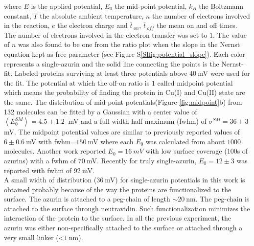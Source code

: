 \documentclass[journal=jacsat,manuscript=article]{achemso}
\newcommand*\me[1]{\ensuremath{\bar{#1}\,}}
\begin{document}
where $E$ is the applied potential, $E_0$ the mid-point potential, $k_B$ the Boltzmann constant, $T$ the absolute ambient temperature, $n$ the number of electrons involved in the reaction, $e$ the electron charge and $\me{t}_{on}$, $\me{t}_{off}$ the mean on and off times. The number of electrons involved in the electron transfer was set to $1$. The value of $n$ was also found to be one from the ratio plot when the slope in the Nernst equation kept as free parameter (see Figure-S\ref{SIfig:potential_slope}). Each color represents a single-azurin and the solid line connecting the points is the Nernst-fit. Labeled proteins surviving at least three potentials above $40~$mV were used for the fit. The potential at which the off-on ratio is $1$ called midpoint potential which means the probability of finding the protein in Cu(I) and Cu(II) state are the same. The distribution of mid-point potentials(Figure-\ref{fig:midpoint}b) from 132 molecules can be fitted by a Gaussian with a center value of $\left<E_0^{SM}\right>=4.5 \pm 1.2~$ mV and a full width half maximum (fwhm) of $\sigma^{SM}=36 \pm 3~$ mV. The midpoint potential values are similar to previously reported values of $6\pm0.6~$mV with fwhm=$150~$mV where each $E_0$ was calculated from about $1000$ molecules.\cite{davis2006monitoring} Another work reported $E_0 = 16~mV$ with low surface coverage (100s of azurins) with a fwhm of $70~$mV.\cite{salverda2010fluorescent} Recently for truly single-azurin, $E_0=12\pm3$ was reported with fwhm of $92~$mV.\cite{akkilic2014chemically-induced}\\
A small width of distribution ($36~$mV) for single-azurin potentials in this work is obtained probably because of the way the proteins are functionalized to the surface. The azurin is attached to a peg-chain of length ${\sim}20~$nm. The peg-chain is attached to the surface through neutravidin. Such functionalization minimizes the interaction of the protein to the surface. In all the previous experiment, the azurin was either non-specifically attached to the surface or attached through a very small linker (<$1~$nm).
\end{document}
